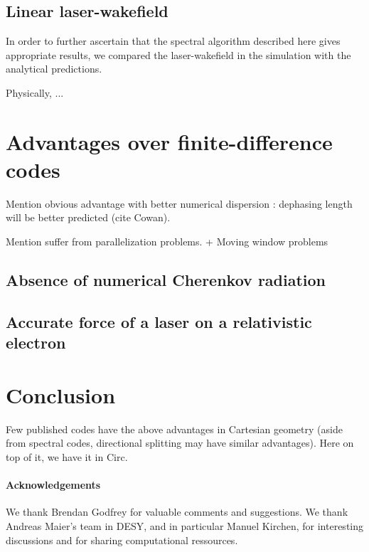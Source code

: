 \documentclass[a4paper]{article}   	%
\begin{document}
\subsection{Linear laser-wakefield}

In order to further ascertain that the spectral algorithm described here gives
appropriate results, we compared the laser-wakefield in the simulation with the
analytical predictions. 

Physically, ...



\section{Advantages over finite-difference codes}
\label{sec:advantages}



Mention obvious advantage with better numerical dispersion : dephasing
length will be better predicted (cite Cowan). 

Mention suffer from parallelization problems. + Moving window problems


\subsection{Absence of numerical Cherenkov radiation}

\subsection{Accurate force of a laser on a relativistic electron}


\section*{Conclusion}

Few published codes have the above advantages in Cartesian geometry (aside
from spectral codes, directional splitting may have similar
advantages). Here on top of it, we have it in Circ.

\paragraph{Acknowledgements}

We thank Brendan Godfrey for valuable comments and
suggestions. We thank Andreas Maier's team in DESY, and in particular
Manuel Kirchen, for interesting discussions and for sharing
computational ressources.
\end{document}
